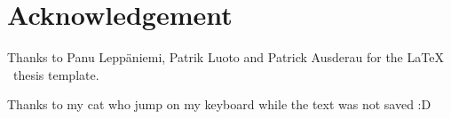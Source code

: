 
\pagestyle{empty}
\chapter*{Acknowledgement}

Thanks to Panu Leppäniemi, Patrik Luoto and Patrick Ausderau for the \LaTeX{} ~thesis template.

Thanks to my cat who jump on my keyboard while the text was not saved :D

\clearpage

